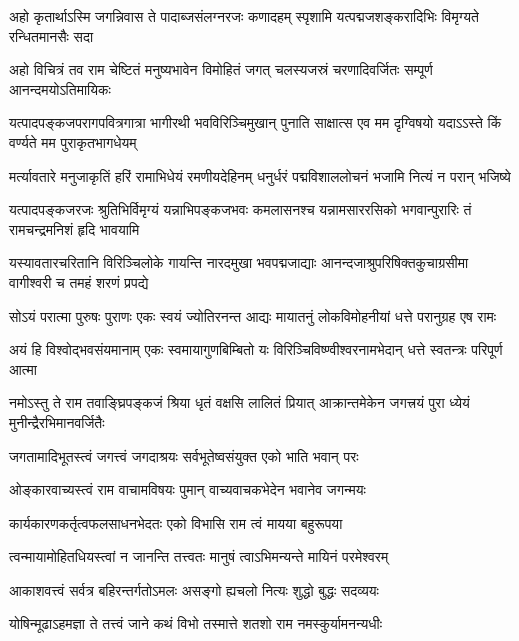 
\fourlineindentedshloka
{अहो कृतार्थाऽस्मि जगन्निवास ते}
{पादाब्जसंलग्नरजः कणादहम्}
{स्पृशामि यत्पद्मजशङ्करादिभिः}
{विमृग्यते रन्धितमानसैः सदा}%

\fourlineindentedshloka
{अहो विचित्रं तव राम चेष्टितं}
{मनुष्यभावेन विमोहितं जगत्}
{चलस्यजस्रं चरणादिवर्जितः}
{सम्पूर्ण आनन्दमयोऽतिमायिकः}%

\fourlineindentedshloka
{यत्पादपङ्कजपरागपवित्रगात्रा}
{भागीरथी भवविरिञ्चिमुखान्  पुनाति}
{साक्षात्स एव मम दृग्विषयो यदाऽऽस्ते}
{किं वर्ण्यते मम पुराकृतभागधेयम्}%

\fourlineindentedshloka
{मर्त्यावतारे मनुजाकृतिं हरिं}
{रामाभिधेयं रमणीयदेहिनम्}
{धनुर्धरं पद्मविशाललोचनं}
{भजामि नित्यं न परान्  भजिष्ये}%

\fourlineindentedshloka
{यत्पादपङ्कजरजः श्रुतिभिर्विमृग्यं}
{यन्नाभिपङ्कजभवः कमलासनश्च}
{यन्नामसाररसिको भगवान्पुरारिः}
{तं  रामचन्द्रमनिशं हृदि भावयामि}%

\fourlineindentedshloka
{यस्यावतारचरितानि विरिञ्चिलोके}
{गायन्ति नारदमुखा भवपद्मजाद्याः}
{आनन्दजाश्रुपरिषिक्तकुचाग्रसीमा}
{वागीश्वरी च तमहं शरणं प्रपद्ये}%

\fourlineindentedshloka
{सोऽयं परात्मा पुरुषः पुराणः}
{एकः स्वयं ज्योतिरनन्त आद्यः}
{मायातनुं लोकविमोहनीयां}
{धत्ते परानुग्रह एष रामः}%

\fourlineindentedshloka
{अयं हि विश्वोद्भवसंयमानाम्}
{एकः  स्वमायागुणबिम्बितो यः}
{विरिञ्चिविष्ण्वीश्वरनामभेदान्}
{धत्ते स्वतन्त्रः परिपूर्ण आत्मा}%

\fourlineindentedshloka
{नमोऽस्तु ते राम तवाङ्घ्रिपङ्कजं}
{श्रिया धृतं वक्षसि लालितं प्रियात्}
{आक्रान्तमेकेन जगत्त्रयं पुरा}
{ध्येयं मुनीन्द्रैरभिमानवर्जितैः}%

\twolineshloka
{जगतामादिभूतस्त्वं जगत्त्वं जगदाश्रयः}
{सर्वभूतेष्वसंयुक्त एको भाति भवान् परः}%

\twolineshloka
{ओङ्कारवाच्यस्त्वं राम वाचामविषयः पुमान्}
{वाच्यवाचकभेदेन भवानेव जगन्मयः}%

\twolineshloka
{कार्यकारणकर्तृत्वफलसाधनभेदतः}
{एको विभासि राम त्वं मायया बहुरूपया}%

\twolineshloka
{त्वन्मायामोहितधियस्त्वां न जानन्ति तत्त्वतः}
{मानुषं त्वाऽभिमन्यन्ते मायिनं परमेश्वरम्}%

\twolineshloka
{आकाशवत्त्वं सर्वत्र बहिरन्तर्गतोऽमलः}
{असङ्गो ह्यचलो नित्यः शुद्धो बुद्धः सदव्ययः}%

\twolineshloka
{योषिन्मूढाऽहमज्ञा ते तत्त्वं जाने कथं विभो}
{तस्मात्ते शतशो राम नमस्कुर्यामनन्यधीः}%

